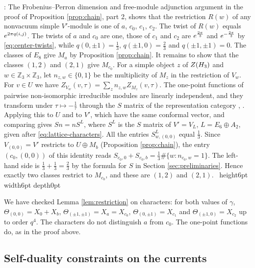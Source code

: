 \documentclass[leqno]{article}
\let\cal\relax
\newcommand{\cal}{\mathcal}
\newcommand{\Z}{\ensuremath{\mathbb{Z}}}
\newcommand{\qed}{\hfill \vrule height6pt  width6pt depth0pt}
\let\i\relax
\newcommand{\i}{\mathrm{i}}
\newenvironment{proof}[1][]{\noindent {\it Proof #1} : }{\hbox{~}\qed
\smallskip
}
\numberwithin{equation}{section}
\begin{document}
\begin{proof}
The Frobenius--Perron dimension and free-module adjunction argument in the proof of Proposition \ref{prop:chain}, part 2, shows that the restriction $R(w)$ of any nonvacuum simple $V'$-module is one of $a$, $c_0$, $c_1$, $c_2$. The twist of $R(w)$ equals $e^{2\pi\i q(i,j)}$. The twists of $a$ and $c_0$ are one, those of $c_1$ and $c_2$ are $e^{\frac{2\pi\i}{3}}$ and $e^{-\frac{2\pi\i}{3}}$ by \eqref{eq:center-twists}, while $q(0,\pm 1) = \frac13$, $q(\pm 1,0) = \frac23$ and $q(\pm 1,\pm 1) = 0$. The classes of $E_8$ give $M_a$ by Proposition \ref{prop:chain}. It remains to show that the classes $(1,2)$ and $(2,1)$ give $M_{c_0}$. For a simple object $z$ of $Z(\cal H_3)$ and $w \in \Z_3 \times \Z_3$, let $n_{z,w} \in \{0,1\}$ be the multiplicity of $M_z$ in the restriction of $V_w$. For $v \in U$ we have $Z_{V_w}(v,\tau) = \sum_z n_{z,w}Z_{M_z}(v,\tau)$. The one-point functions of pairwise non-isomorphic irreducible modules are linearly independent, and they transform under $\tau \mapsto -\frac{1}{\tau}$ through the $S$ matrix of the representation category \cite[Section 5]{Zhu96}, \cite{Hua08}. Applying this to $U$ and to $V'$, which have the same conformal vector, and comparing gives $S n = n S^{L}$, where $S^L$ is the $S$ matrix of $V' = V_L$, $L = E_6 \oplus A_2$, given after \eqref{eq:lattice-characters}. All the entries $S^L_{w,(0,0)}$ equal $\frac13$. Since $V_{(0,0)} = V'$ restricts to $U \oplus M_b$ (Proposition \ref{prop:chain}), the entry $(c_0,(0,0))$ of this identity reads $S_{c_0,0}+S_{c_0,b} = \frac13 \#\{w : n_{c_0,w} = 1\}$. The left-hand side is $\frac13+\frac13 = \frac23$ by the formula for $S$ in Section \ref{sec:preliminaries}. Hence exactly two classes restrict to $M_{c_0}$, and these are $(1,2)$ and $(2,1)$.
\end{proof}

We have checked Lemma \ref{lem:restriction} on characters: for both values of $\gamma$, $\Theta_{(0,0)} = X_0+X_b$, $\Theta_{(\pm 1,\pm 1)} = X_a = X_{c_0}$, $\Theta_{(0,\pm 1)} = X_{c_1}$ and $\Theta_{(\pm 1,0)} = X_{c_2}$ up to order $q^4$. The characters do not distinguish $a$ from $c_0$. The one-point functions do, as in the proof above.

\subsection{Self-duality constraints on the currents}
\end{document}
